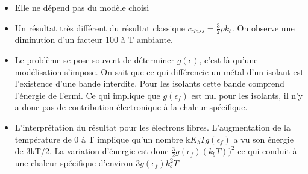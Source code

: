 \begin{itemize}[label=]
\item Elle ne dépend pas du modèle choisi
\item Un résultat très différent du résultat classique $c_{class}=\frac{3}{2}\rho k_b$. On observe une diminution d'un facteur 100 à T ambiante.
\item Le problème se pose souvent de déterminer $g(\epsilon)$, c'est là qu'une modélisation s'impose. On sait que ce qui différencie un métal d'un isolant est l'existence d'une bande interdite. Pour les isolants cette bande comprend l'énergie de Fermi. Ce qui implique que $g(\epsilon_f)$ est nul pour les isolants, il n'y a donc pas de contribution électronique à la chaleur spécifique.
\item L'interprétation du résultat pour les électrons libres. L'augmentation de la température de 0 à T implique qu'un nombre k$K_bTg(\epsilon_f)$ a vu son énergie de 3kT/2. La variation d'énergie est donc $\frac{3}{2}g(\epsilon_f)(k_bT))^2$ ce qui conduit à une chaleur spécifique d'environ $3g(\epsilon_f)k_b^2T$
\end{itemize}
